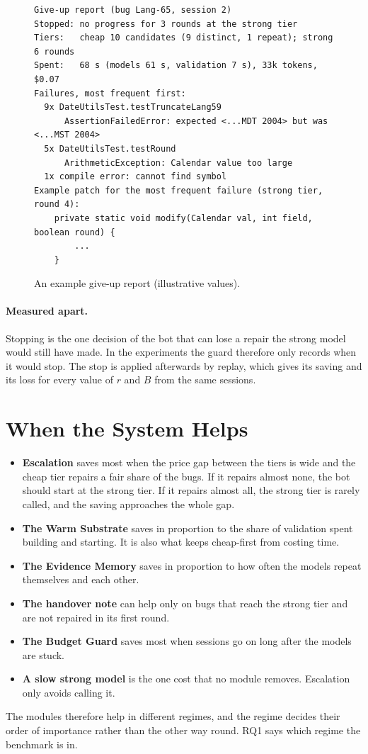 \begin{figure}[htbp]
\centering
\begin{minipage}{0.95\textwidth}
\begin{Verbatim}[frame=single,rulecolor=\color{boxline},fontsize=\footnotesize,framesep=2mm]
Give-up report (bug Lang-65, session 2)
Stopped: no progress for 3 rounds at the strong tier
Tiers:   cheap 10 candidates (9 distinct, 1 repeat); strong 6 rounds
Spent:   68 s (models 61 s, validation 7 s), 33k tokens, $0.07
Failures, most frequent first:
  9x DateUtilsTest.testTruncateLang59
      AssertionFailedError: expected <...MDT 2004> but was <...MST 2004>
  5x DateUtilsTest.testRound
      ArithmeticException: Calendar value too large
  1x compile error: cannot find symbol
Example patch for the most frequent failure (strong tier, round 4):
    private static void modify(Calendar val, int field, boolean round) {
        ...
    }
\end{Verbatim}
\end{minipage}
\caption{An example give-up report (illustrative values).}
\label{fig:sys-report}
\end{figure}

\paragraph{Measured apart.} Stopping is the one decision of the bot that can
lose a repair the strong model would still have made. In the experiments the
guard therefore only records when it would stop. The stop is applied
afterwards by replay, which gives its saving and its loss for every value of
$r$ and $B$ from the same sessions.

\section{When the System Helps}
\label{sec:sys-regimes}

\begin{itemize}
\item \textbf{Escalation} saves most when the price gap between the tiers is
wide and the cheap tier repairs a fair share of the bugs. If it repairs almost
none, the bot should start at the strong tier. If it repairs almost all, the
strong tier is rarely called, and the saving approaches the whole gap.
\item \textbf{The Warm Substrate} saves in proportion to the share of
validation spent building and starting. It is also what keeps cheap-first from
costing time.
\item \textbf{The Evidence Memory} saves in proportion to how often the models
repeat themselves and each other.
\item \textbf{The handover note} can help only on bugs that reach the strong
tier and are not repaired in its first round.
\item \textbf{The Budget Guard} saves most when sessions go on long after the
models are stuck.
\item \textbf{A slow strong model} is the one cost that no module removes.
Escalation only avoids calling it.
\end{itemize}

The modules therefore help in different regimes, and the regime decides their
order of importance rather than the other way round. RQ1 says which regime the
benchmark is in.
